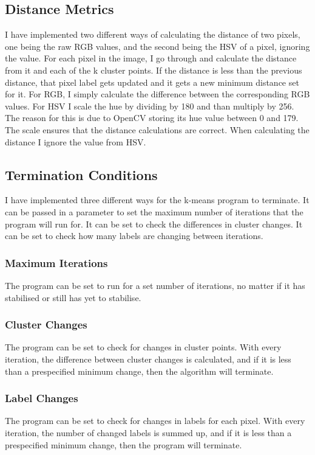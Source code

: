 \documentclass{article}
\begin{document}
\subsection{Distance Metrics}
I have implemented two different ways of calculating the distance of two pixels,
one being the raw RGB values, and the second being the HSV of a pixel, ignoring
the value. For each pixel in the image, I go through and calculate the distance
from it and each of the k cluster points. If the distance is less than the
previous distance, that pixel label gets updated and it gets a new minimum
distance set for it. For RGB, I simply calculate the difference between the
corresponding RGB values. For HSV I scale the hue by dividing by 180 and than
multiply by 256. The reason for this is due to OpenCV storing its hue value
between 0 and 179. The scale ensures that the distance calculations are
correct. When calculating the distance I ignore the value from HSV.

\subsection{Termination Conditions}
I have implemented three different ways for the k-means program to terminate.
It can be passed in a parameter to set the maximum number of iterations that the
program will run for. It can be set to check the differences in cluster
changes. It can be set to check how many labels are changing between iterations.

\subsubsection{Maximum Iterations}
The program can be set to run for a set number of iterations, no matter if it
has stabilised or still has yet to stabilise.

\subsubsection{Cluster Changes}
The program can be set to check for changes in cluster points. With every
iteration, the difference between cluster changes is calculated, and if it is
less than a prespecified minimum change, then the algorithm will terminate.

\subsubsection{Label Changes}
The program can be set to check for changes in labels for each pixel. With every
iteration, the number of changed labels is summed up, and if it is less than a
prespecified minimum change, then the program will terminate.
\end{document}
